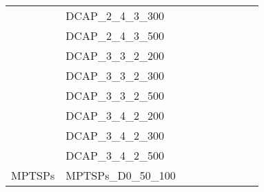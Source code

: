 \begin{table}[]
{\begin{tabular}{|c|l|l|l|l|l|l|l|l|}
			& DCAP\_2\_4\_3\_300            &                                    &                                  &                            &                          &                                         &                                 &                                \\
			& DCAP\_2\_4\_3\_500            &                                    &                                  &                            &                          &                                         &                                 &                                \\
			& DCAP\_3\_3\_2\_200            &                                    &                                  &                            &                          &                                         &                                 &                                \\
			& DCAP\_3\_3\_2\_300            &                                    &                                  &                            &                          &                                         &                                 &                                \\
			& DCAP\_3\_3\_2\_500            &                                    &                                  &                            &                          &                                         &                                 &                                \\
			& DCAP\_3\_4\_2\_200            &                                    &                                  &                            &                          &                                         &                                 &                                \\
			& DCAP\_3\_4\_2\_300            &                                    &                                  &                            &                          &                                         &                                 &                                \\
			& DCAP\_3\_4\_2\_500            &                                    &                                  &                            &                          &                                         &                                 &                                \\ \hline
			\multirow{4}{*}{MPTSPs}  & MPTSPs\_D0\_50\_100           &                                    &                                  &                            &                          &                                         &                                 &                                \\

\end{tabular}}
\end{table}

